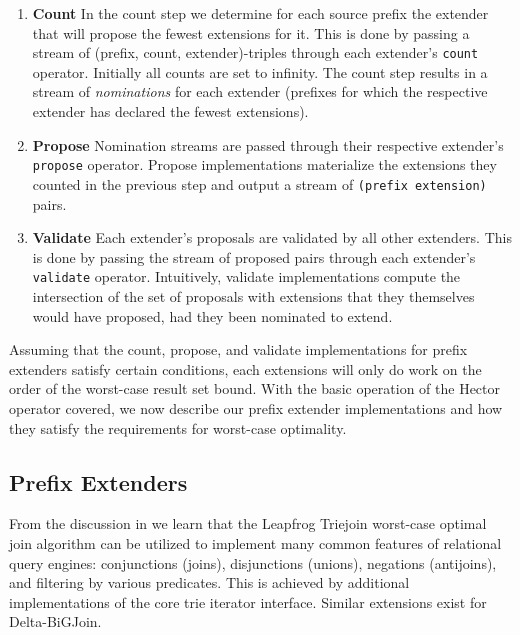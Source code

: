 \documentclass[../index.tex]{subfiles}
\begin{document}
\begin{enumerate}
  \item \textbf{Count} In the count step we determine for each source
    prefix the extender that will propose the fewest extensions for
    it. This is done by passing a stream of (prefix, count,
    extender)-triples through each extender's \texttt{count}
    operator. Initially all counts are set to infinity. The count step
    results in a stream of \emph{nominations} for each extender
    (prefixes for which the respective extender has declared the
    fewest extensions).

  \item \textbf{Propose} Nomination streams are passed through their
    respective extender's \texttt{propose} operator. Propose
    implementations materialize the extensions they counted in the
    previous step and output a stream of \texttt{(prefix extension)}
    pairs.

  \item \textbf{Validate} Each extender's proposals are validated by
    all other extenders. This is done by passing the stream of
    proposed pairs through each extender's \texttt{validate}
    operator. Intuitively, validate implementations compute the
    intersection of the set of proposals with extensions that they
    themselves would have proposed, had they been nominated to extend.
\end{enumerate}

Assuming that the count, propose, and validate implementations for
prefix extenders satisfy certain conditions, each extensions will only
do work on the order of the worst-case result set bound. With the
basic operation of the Hector operator covered, we now describe our
prefix extender implementations and how they satisfy the requirements
for worst-case optimality.

\subsection{Prefix Extenders} \label{impl-extenders}

From the discussion in \cite{veldhuizen2012leapfrog} we learn that the
Leapfrog Triejoin worst-case optimal join algorithm can be utilized to
implement many common features of relational query engines:
conjunctions (joins), disjunctions (unions), negations (antijoins),
and filtering by various predicates. This is achieved by additional
implementations of the core trie iterator interface. Similar
extensions exist for Delta-BiGJoin.
\end{document}
